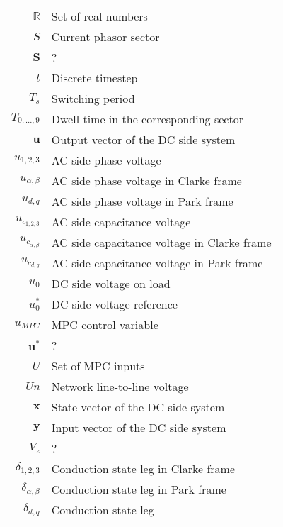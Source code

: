 \begin{longtable}{r l}
  $\mathbb{R}$                      & Set of real numbers\\
  $S$                               & Current phasor sector\\
  $\boldsymbol{S}$                  & ?\\
  $t$                               & Discrete timestep\\
  $T_s$                             & Switching period\\
  $T_{0,\dots,9}$                   & Dwell time in the corresponding sector\\
  $\boldsymbol{u}$                  & Output vector of the DC side system\\
  $u_{1,2,3}$                       & AC side phase voltage\\
  $u_{\alpha,\beta}$                & AC side phase voltage in Clarke frame\\
  $u_{d,q}$                         & AC side phase voltage in Park frame\\
  $u_{c_{1,2,3}}$                   & AC side capacitance voltage\\
  $u_{c_{\alpha,\beta}}$            & AC side capacitance voltage in Clarke frame\\
  $u_{c_{d,q}}$                     & AC side capacitance voltage in Park frame\\
  $u_0$                             & DC side voltage on load\\
  $u^*_0$                           & DC side voltage reference\\
  $u_{MPC}$                         & MPC control variable\\
  $\boldsymbol{u}^*$                & ?\\
  $U$                               & Set of MPC inputs\\
  $Un$                              & Network line-to-line voltage\\
  $\boldsymbol{x}$                  & State vector of the DC side system\\
  $\boldsymbol{y}$                  & Input vector of the DC side system\\
  $V_z$                             & ?\\
  $\delta_{1,2,3}$                  & Conduction state leg in Clarke frame\\
  $\delta_{\alpha,\beta}$           & Conduction state leg in Park frame\\
  $\delta_{d,q}$                    & Conduction state leg\\

\end{longtable}
